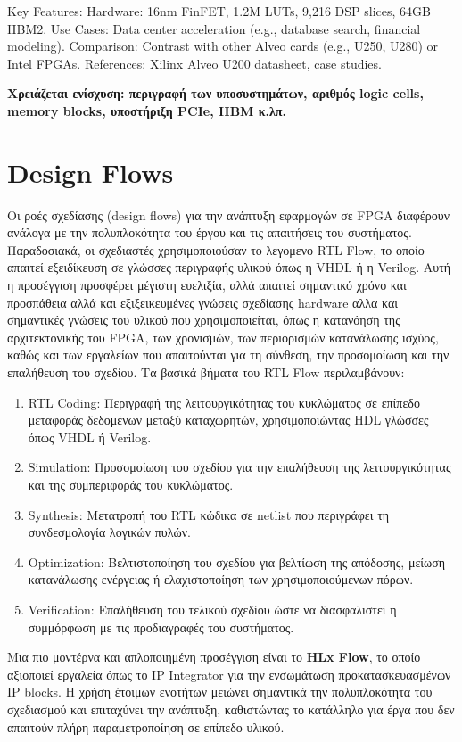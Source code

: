 Key Features:
Hardware: 16nm FinFET, 1.2M LUTs, 9,216 DSP slices, 64GB HBM2.
Use Cases: Data center acceleration (e.g., database search, financial modeling).
Comparison: Contrast with other Alveo cards (e.g., U250, U280) or Intel FPGAs.
References: Xilinx Alveo U200 datasheet, case studies.

\textbf{Xρειάζεται ενίσχυση: περιγραφή των υποσυστημάτων, αριθμός logic cells, memory blocks, υποστήριξη PCIe, HBM κ.λπ.}

\section{Design Flows}

Οι ροές σχεδίασης (design flows) για την ανάπτυξη εφαρμογών σε FPGA διαφέρουν ανάλογα με την πολυπλοκότητα του έργου και τις απαιτήσεις του συστήματος. 
Παραδοσιακά, οι σχεδιαστές χρησιμοποιούσαν το λεγομενο RTL Flow, το οποίο απαιτεί εξειδίκευση σε γλώσσες περιγραφής υλικού όπως η VHDL ή η Verilog. 
Αυτή η προσέγγιση προσφέρει μέγιστη ευελιξία, αλλά απαιτεί σημαντικό χρόνο και προσπάθεια αλλά και εξιξεικευμένες γνώσεις σχεδίασης hardware αλλα και 
σημαντικές γνώσεις του υλικού που χρησιμοποιείται, όπως η κατανόηση της αρχιτεκτονικής του FPGA, των χρονισμών, των περιορισμών κατανάλωσης ισχύος, 
καθώς και των εργαλείων που απαιτούνται για τη σύνθεση, την προσομοίωση και την επαλήθευση του σχεδίου. Τα βασικά βήματα του RTL Flow περιλαμβάνουν:

\begin{enumerate}
  \item  RTL Coding: Περιγραφή της λειτουργικότητας του κυκλώματος σε επίπεδο μεταφοράς δεδομένων μεταξύ καταχωρητών, χρησιμοποιώντας HDL γλώσσες όπως VHDL ή Verilog.
  \item  Simulation: Προσομοίωση του σχεδίου για την επαλήθευση της λειτουργικότητας και της συμπεριφοράς του κυκλώματος.
  \item  Synthesis: Μετατροπή του RTL κώδικα σε netlist που περιγράφει τη συνδεσμολογία λογικών πυλών.
  \item  Optimization: Βελτιστοποίηση του σχεδίου για βελτίωση της απόδοσης, μείωση κατανάλωσης ενέργειας ή ελαχιστοποίηση των χρησιμοποιούμενων πόρων.
  \item  Verification: Επαλήθευση του τελικού σχεδίου ώστε να διασφαλιστεί η συμμόρφωση με τις προδιαγραφές του συστήματος.
\end{enumerate}

Μια πιο μοντέρνα και απλοποιημένη προσέγγιση είναι το \textbf{HLx Flow}, το οποίο αξιοποιεί εργαλεία όπως το IP Integrator για την ενσωμάτωση προκατασκευασμένων IP blocks. 
Η χρήση έτοιμων ενοτήτων μειώνει σημαντικά την πολυπλοκότητα του σχεδιασμού και επιταχύνει την ανάπτυξη, καθιστώντας το κατάλληλο για έργα που δεν απαιτούν πλήρη παραμετροποίηση σε επίπεδο υλικού.


